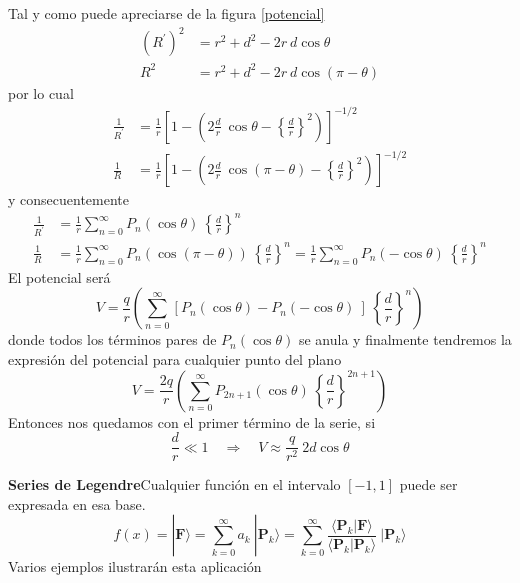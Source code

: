 \documentclass[spanish,notitlepage,letterpaper,12pt]{article}
\begin{document}
Tal y como puede apreciarse de la figura \ref{potencial}
\begin{align*}
\left(  R^{\prime}\right)  ^{2}  & =r^{2}+d^{2}-2r\ d\cos\theta\\
R^{2}  & =r^{2}+d^{2}-2r\ d\cos\left(  \pi-\theta\right)
\end{align*}
por lo cual
\begin{align*}
\frac{1}{R^{\prime}}  & =\frac{1}{r}\left[  1-\left(  2\frac{d}{r}\ \cos
\theta-\left\{  \frac{d}{r}\right\}  ^{2}\right)  \right]  ^{-1/2}\\
\frac{1}{R}  & =\frac{1}{r}\left[  1-\left(  2\frac{d}{r}\ \cos\left(
\pi-\theta\right)  -\left\{  \frac{d}{r}\right\}  ^{2}\right)  \right]
^{-1/2}%
\end{align*}
y consecuentemente
\begin{align*}
\frac{1}{R^{\prime}}  & =\frac{1}{r}\sum_{n=0}^{\infty}P_{n}(\cos
\theta)\ \left\{  \frac{d}{r}\right\}  ^{n}\\
\frac{1}{R}  & =\frac{1}{r}\sum_{n=0}^{\infty}P_{n}\left(  \cos\left(
\pi-\theta\right)  \right)  \ \left\{  \frac{d}{r}\right\}  ^{n}=\frac{1}%
{r}\sum_{n=0}^{\infty}P_{n}(-\cos\theta)\ \left\{  \frac{d}{r}\right\}  ^{n}%
\end{align*}
El potencial ser\'{a}
\[
V=\frac{q}{r}\left(  \sum_{n=0}^{\infty}\left[  P_{n}(\cos\theta)-P_{n}%
(-\cos\theta)\ \right]  \ \left\{  \frac{d}{r}\right\}  ^{n}\right)
\]
donde todos los t\'{e}rminos pares de $P_{n}(\cos\theta)$ se anula y
finalmente tendremos la expresi\'{o}n del potencial para cualquier punto del
plano
\[
V=\frac{2q}{r}\left(  \sum_{n=0}^{\infty}P_{2n+1}(\cos\theta)\ \left\{
\frac{d}{r}\right\}  ^{2n+1}\right)
\]
Entonces nos quedamos con el primer t\'{e}rmino de la serie, si
\[
\frac{d}{r}\ll1\quad\Rightarrow\quad V\approx\frac{q}{r^{2}}\ 2d\cos\theta
\]

\textbf{Series de Legendre}\newline Cualquier funci\'{o}n en el intervalo
$\left[  -1,1\right]  $ puede ser expresada en esa base.
\[
f(x)=|\mathbf{F}\rangle=\sum_{k=0}^{\infty}a_{k}\ |\mathbf{P}_{k}\rangle
=\sum_{k=0}^{\infty}\frac{\langle\mathbf{P}_{k}|\mathbf{F}\rangle}%
{\langle\mathbf{P}_{k}|\mathbf{P}_{k}\rangle}\ |\mathbf{P}_{k}\rangle
\]
Varios ejemplos ilustrar\'{a}n esta aplicaci\'{o}n
\end{document}
